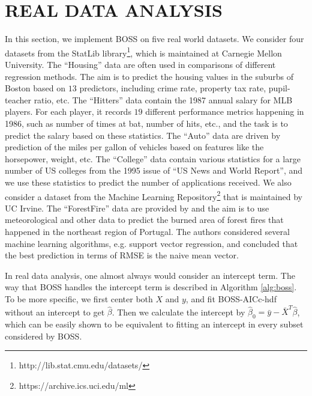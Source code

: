 \section{REAL DATA ANALYSIS}
\label{sec:real_data}
In this section, we implement BOSS on five real world datasets. We consider four datasets from the StatLib library\footnote{http://lib.stat.cmu.edu/datasets/}, which is maintained at Carnegie Mellon University. The ``Housing'' data are often used in comparisons of different regression methods. The aim is to predict the housing values in the suburbs of Boston based on $13$ predictors, including crime rate, property tax rate, pupil-teacher ratio, etc. The ``Hitters'' data contain the 1987 annual salary for MLB players. For each player, it records $19$ different performance metrics happening in 1986, such as number of times at bat, number of hits, etc., and the task is to predict the salary based on these statistics. The ``Auto'' data are driven by prediction of the miles per gallon of vehicles based on features like the horsepower, weight, etc. The ``College'' data contain various statistics for a large number of US colleges from the 1995 issue of ``US News and World Report'', and we use these statistics to predict the number of applications received. We also consider a dataset from the Machine Learning Repository\footnote{https://archive.ics.uci.edu/ml} that is maintained by UC Irvine. The ``ForestFire'' data are provided by \citet{cortez2007data} and the aim is to use meteorological and other data to predict the burned area of forest fires that happened in the northeast region of Portugal. The authors considered several machine learning algorithms, e.g. support vector regression, and concluded that the best prediction in terms of RMSE is the naive mean vector.


In real data analysis, one almost always would consider an intercept term. The way that BOSS handles the intercept term is described in Algorithm \ref{alg:boss}. To be more specific, we first center both $X$ and $y$, and fit BOSS-AICc-hdf without an intercept to get $\hat{\beta}$. Then we calculate the intercept by $
\hat{\beta}_0=\bar{y} - \bar{X}^T \hat{\beta}$, which can be easily shown to be equivalent to fitting an intercept in every subset considered by BOSS. 

